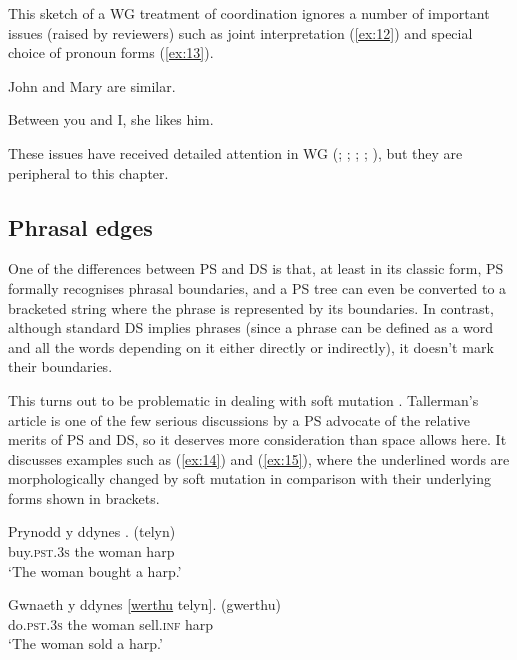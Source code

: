 \documentclass[output=paper
 	        ,biblatex
                ,babelshorthands
                ,newtxmath
                ,draftmode
                ,colorlinks, citecolor=brown
]{langscibook}
\begin{document}
This sketch of a WG treatment of coordination ignores a number of important issues (raised by reviewers) such as joint interpretation (\ref{ex:12}) and special choice of pronoun forms (\ref{ex:13}).

\begin{exe}
	\ex \label{ex:12} John and Mary are similar.

	\ex \label{ex:13} Between you and I, she likes him.
\end{exe}

These issues have received detailed attention in WG (\citealt[Chapter~5]{Hudson84a-u}; \citeyear{Hudson88a}; \citeyear[Chapter~14]{Hudson90a-u}; \citeyear{Hudson1995}; \citeyear[175--181, 304--307]{Hudson2010b-u}), but they are peripheral to this chapter.


\subsection{Phrasal edges}
\label{sec:4.3}

One of the differences between PS and DS is that, at least in its classic form, PS formally recognises phrasal boundaries, and a PS tree can even be converted to a bracketed string where the phrase is represented by its boundaries. In contrast, although standard DS implies phrases (since a phrase can be defined as a word and all the words depending on it either directly or indirectly), it doesn’t mark their boundaries.

This turns out to be problematic in dealing with  soft mutation \citep{Tallerman2009}. Tallerman’s article is one of the few serious discussions by a PS advocate of the relative merits of PS and DS, so it deserves more consideration than space allows here. It discusses examples such as (\ref{ex:14}) and (\ref{ex:15}), where the underlined words are morphologically changed by soft mutation in comparison with their underlying forms shown in brackets.

\begin{exe}
	\ex \label{ex:14}
	\gll Prynodd y ddynes \underline{}. (telyn)\\
	buy.\textsc{pst}.3\textsc{s} the woman harp\\
	\glt ‘The woman bought a harp.’

	\ex \label{ex:15}
	\gll Gwnaeth y ddynes [\underline{werthu} telyn]. (gwerthu)\\
	do.\textsc{pst}.3\textsc{s} the woman sell.\textsc{inf} harp\\
	\glt ‘The woman sold a harp.’
\end{exe}
\end{document}
